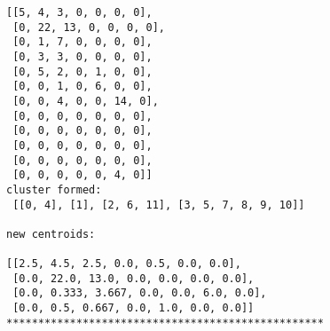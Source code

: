 \documentclass[11pt]{article}
\begin{document}
\begin{Verbatim}[commandchars=\\\{\}]
[[5, 4, 3, 0, 0, 0, 0],
 [0, 22, 13, 0, 0, 0, 0],
 [0, 1, 7, 0, 0, 0, 0],
 [0, 3, 3, 0, 0, 0, 0],
 [0, 5, 2, 0, 1, 0, 0],
 [0, 0, 1, 0, 6, 0, 0],
 [0, 0, 4, 0, 0, 14, 0],
 [0, 0, 0, 0, 0, 0, 0],
 [0, 0, 0, 0, 0, 0, 0],
 [0, 0, 0, 0, 0, 0, 0],
 [0, 0, 0, 0, 0, 0, 0],
 [0, 0, 0, 0, 0, 4, 0]]
cluster formed:
 [[0, 4], [1], [2, 6, 11], [3, 5, 7, 8, 9, 10]]

new centroids:

[[2.5, 4.5, 2.5, 0.0, 0.5, 0.0, 0.0],
 [0.0, 22.0, 13.0, 0.0, 0.0, 0.0, 0.0],
 [0.0, 0.333, 3.667, 0.0, 0.0, 6.0, 0.0],
 [0.0, 0.5, 0.667, 0.0, 1.0, 0.0, 0.0]]
**************************************************

    \end{Verbatim}


    
    
    
    
\end{document}
